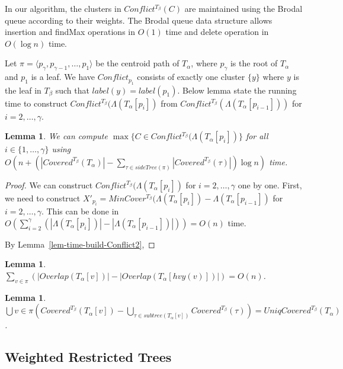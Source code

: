 \documentclass[final,1p,times]{elsarticle}
\newcommand{\TA}{T_\alpha}
\newcommand{\TB}{T_\beta}
\newtheorem{lemma}[theorem]{Lemma}
\begin{document}
    In our algorithm, the clusters in $Conflict^{\TB}(C)$ are maintained using the Brodal queue according to their weights. 
    The Brodal queue data structure allows insertion and findMax operations in $O(1)$ time and delete operation in $O(\log n)$ time.

    Let $\pi = \langle p_{\gamma}, p_{\gamma - 1}, \dots, p_1 \rangle$ be the centroid path of $\TA$, where $p_{\gamma}$ is the root of $\TA$ and $p_1$ is a leaf.
    We have $Conflict_{p_1}$ consists of exactly one cluster $\{y\}$ where $y$ is the leaf in $T_{\beta}$ such that $label(y) = label(p_1)$.
    Below lemma state the running time to construct $Conflict^{\TB}(\Lambda(\TA[p_i])$ from $Conflict^{\TB}(\Lambda(\TA[p_{i-1}]))$ for $i = 2, \ldots, \gamma$.
    \begin{lemma}
	    We can compute $\max \{ C \in Conflict^{\TB}(\Lambda(\TA[p_i]) \}$ for all $i \in \{1, \ldots, \gamma\}$ 
	    using $O\left(n + \left( |Covered^{\TB}(\TA)| - \sum_{\tau \in sideTree(\pi)} |Covered^{\TB}(\tau)| \right) \log n \right)$ time.
    \end{lemma}
    \begin{proof}
	    We can construct $Conflict^{\TB}(\Lambda(\TA[p_i])$ for $i = 2, \ldots, \gamma$ one by one.
	    First, we need to construct $X'_{p_i} = MinCover^{\TB}(\Lambda(\TA[p_i]) - \Lambda(\TA[p_{i-1}])$ for $i = 2, \ldots, \gamma$.
	    This can be done in $O( \sum_{i=2}^{\gamma} (|\Lambda(\TA[p_i])| - |\Lambda(\TA[p_{i-1}])|) ) = O(n)$ time.

	    By Lemma~\ref{lem-time-build-Conflict2}, 


    \end{proof}

    \begin{lemma}
	    $\sum_{v \in \pi} \left(|Overlap(T_{\alpha}[v])| - |Overlap(T_{\alpha}[hvy(v)])| \right) = O(n)$.
    \end{lemma}

    \begin{lemma}
	    $\bigcup{v \in \pi} \left( Covered^{\TB}(T_{\alpha}[v]) - \bigcup_{\tau \in subtree(T_{\alpha}[v])} Covered^{\TB}(\tau) \right) = UniqCovered^{\TB}(\TA)$.
    \end{lemma}

    \subsection{Weighted Restricted Trees}
    \label{subsec:restrictedweighted}
\end{document}
